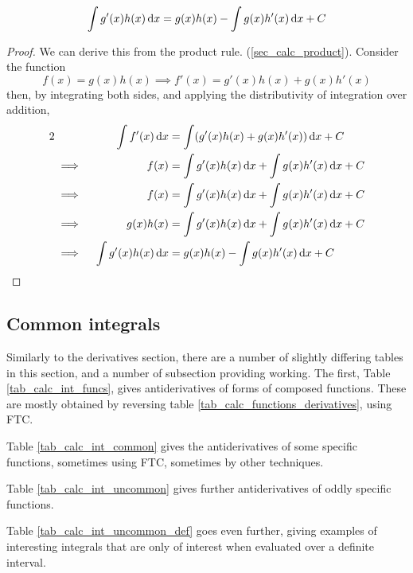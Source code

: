 \begin{theorem}
    \begin{equation*}
        \integ{g'(x)h(x)}{x} = g(x)h(x) - \integ{g(x)h'(x)}{x} + C
    \end{equation*}
\end{theorem}
\begin{proof}
    We can derive this from the product rule.
    (\ref{sec_calc_product}).  Consider the function
    \begin{equation*}
        f(x) = g(x) h(x) \implies f'(x) = g'(x) h(x) + g(x) h'(x)
    \end{equation*}
    then, by integrating both sides, and applying the distributivity of
    integration over addition,
    \begin{alignat*} 2
        && \integ{f'(x)}{x} &= \integ{(g'(x)h(x) + g(x)h'(x))}{x} + C \\
        &\implies{}& f(x) &= \integ{g'(x)h(x)}{x} + \integ{g(x)h'(x)}{x} + C \\
        &\implies{}& f(x) &= \integ{g'(x)h(x)}{x} + \integ{g(x)h'(x)}{x} + C \\
        &\implies{}& g(x)h(x)
            &= \integ{g'(x)h(x)}{x} + \integ{g(x)h'(x)}{x} + C \\
        &\implies{}& \integ{g'(x)h(x)}{x}
            &= g(x)h(x) - \integ{g(x)h'(x)}{x} + C \qedhere \\
    \end{alignat*}
\end{proof}

\subsection{Common integrals}

Similarly to the derivatives section, there are a number of slightly differing
tables in this section, and a number of subsection providing working. The first,
Table \ref{tab_calc_int_funcs}, gives antiderivatives of forms of composed
functions.  These are mostly obtained by reversing table
\ref{tab_calc_functions_derivatives}, using FTC.

Table \ref{tab_calc_int_common} gives the antiderivatives of some specific
functions, sometimes using FTC, sometimes by other techniques.

Table \ref{tab_calc_int_uncommon} gives further antiderivatives of oddly
specific functions.

Table \ref{tab_calc_int_uncommon_def} goes even further, giving examples of
interesting integrals that are only of interest when evaluated over a definite
interval.


